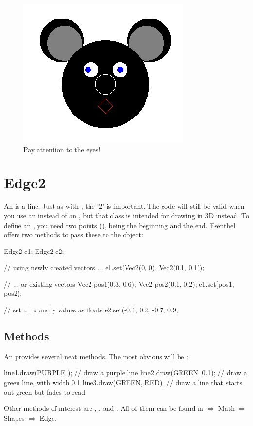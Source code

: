 \begin{figure}[h]
\centering
\includegraphics[width=0.4\linewidth]{../images/circle_exercise}
\caption[]{Pay attention to the eyes!}
\label{fig:pos2D}
\end{figure}

\section{Edge2}
An  is a line. Just as with , the '2' is important. The code will still be valid when you use an  instead of an , but that class is intended for drawing in 3D instead. To define an , you need two points (), being the beginning and the end. Esenthel offers two methods to pass these to the object:

\begin{code}
Edge2 e1;
Edge2 e2;

// using newly created vectors ...
e1.set(Vec2(0, 0), Vec2(0.1, 0.1));

// ... or existing vectors
Vec2 pos1(0.3, 0.6);
Vec2 pos2(0.1, 0.2);
e1.set(pos1, pos2);

// set all x and y values as floats
e2.set(-0.4, 0.2, -0.7, 0.9;
\end{code}

\subsection{Methods}
An  provides several neat methods. The most obvious will be :

\begin{code}
line1.draw(PURPLE    ); // draw a purple line
line2.draw(GREEN, 0.1); // draw a green line, with width 0.1
line3.draw(GREEN, RED); // draw a line that starts out green but fades to read
\end{code}

Other methods of interest are , ,  and . All of them can be found in $\Rightarrow$ Math $\Rightarrow$ Shapes $\Rightarrow$ Edge.

